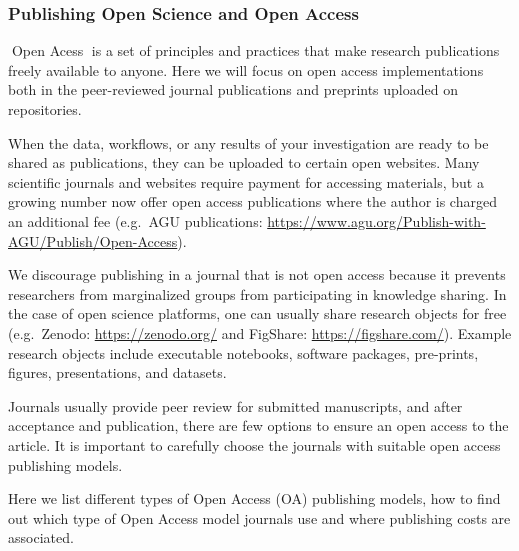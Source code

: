 \documentclass[
  letterpaper,
  DIV=11,
  numbers=noendperiod]{scrreport}
\begin{document}
\hypertarget{publishing-open-science-and-open-access-1}{%
\subsubsection{Publishing Open Science and Open
Access}\label{publishing-open-science-and-open-access-1}}

{📖}Open Acess{📖} is a set of principles and practices that make
research publications freely available to anyone. Here we will focus on
open access implementations both in the peer-reviewed journal
publications and preprints uploaded on repositories.

When the data, workflows, or any results of your investigation are ready
to be shared as publications, they can be uploaded to certain open
websites. Many scientific journals and websites require payment for
accessing materials, but a growing number now offer open access
publications where the author is charged an additional fee (e.g.~AGU
publications:
\url{https://www.agu.org/Publish-with-AGU/Publish/Open-Access}).

We discourage publishing in a journal that is not open access because it
prevents researchers from marginalized groups from participating in
knowledge sharing. In the case of open science platforms, one can
usually share research objects for free (e.g.~Zenodo:
\url{https://zenodo.org/} and FigShare: \url{https://figshare.com/}).
Example research objects include executable notebooks, software
packages, pre-prints, figures, presentations, and datasets.

Journals usually provide peer review for submitted manuscripts, and
after acceptance and publication, there are few options to ensure an
open access to the article. It is important to carefully choose the
journals with suitable open access publishing models.

Here we list different types of Open Access (OA) publishing models, how
to find out which type of Open Access model journals use and where
publishing costs are associated.
\end{document}

